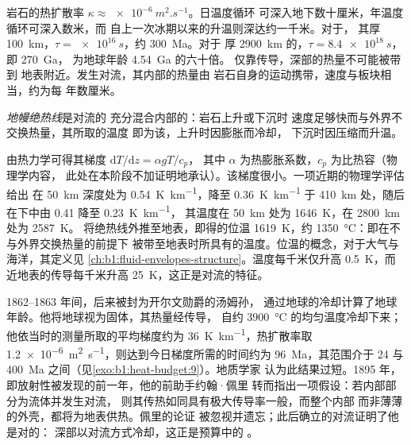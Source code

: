 岩石的热扩散率 $\kappa \approx \qty{e-6}{m^2.s^{-1}}$。日温度循环
可深入地下数十厘米，年温度循环可深入数米，而
自上一次冰期以来的升温则深达约一千米。对于，
其厚 \qty{100}{km}，$\tau = \qty{e16}{s}$，约 \qty{300}{Ma}。对于
厚 \qty{2900}{km} 的，$\tau = \qty{8.4e18}{s}$，即 \qty{270}{Ga}，
为地球年龄 \qty{4.54}{Ga} 的六十倍。%
仅靠传导，深部的热量不可能被带到
地表附近。发生对流，其内部的热量由
岩石自身的运动携带，速度与板块相当，约为每
年数厘米。%

\begin{definition}[地幔绝热线]\label{def:b1:heat-budget:adiabat}
\emph{地幔绝热线}是对流的
充分混合内部的：岩石上升或下沉时
速度足够快而与外界不交换热量，其所取的温度
即为该，上升时因膨胀而冷却，
下沉时因压缩而升温。
\end{definition}

由热力学可得其梯度 $\mathrm dT/\mathrm dz = \alpha g T/c_p$，
其中 $\alpha$ 为热膨胀系数，$c_p$ 为比热容（物理学内容，
此处在本阶段不加证明地承认）。该梯度很小。一项近期的物理学评估给出
在 \qty{50}{km} 深度处为 \qty{0.54}{K.km^{-1}}，降至 \qty{0.36}{K.km^{-1}}
于 \qty{410}{km} 处，随后在下中由 0.41 降至 \qty{0.23}{K.km^{-1}}，
其温度在 \qty{50}{km} 处为 \qty{1646}{K}，在 \qty{2800}{km} 处为 \qty{2587}{K}。
将绝热线外推至地表，即得的位温
\qty{1619}{K}，约 \qty{1350}{\degreeCelsius}：即在不与外界交换热量的前提下
被带至地表时所具有的温度。位温的概念，对于大气与
海洋，其定义见
\cref{ch:b1:fluid-envelopes-structure}。温度每千米仅升高
\qty{0.5}{K}，而近地表的传导每千米升高
\qty{25}{K}，这正是对流的特征。

\begin{history}[约翰·佩里与冷却的地球]
1862--1863 年间，后来被封为开尔文勋爵的汤姆孙，
通过地球的冷却计算了地球年龄。他将地球视为固体，其热量经传导，
自约 \qty{3900}{\degreeCelsius} 的均匀温度冷却下来；
他依当时的测量所取的平均梯度约为
\qty{36}{K.km^{-1}}，热扩散率取
\qty{1.2e-6}{m^2.s^{-1}}，则达到今日梯度所需的时间约为
\qty{96}{Ma}，其范围介于 24 与 \qty{400}{Ma} 之间（见\cref{exo:b1:heat-budget:9}）。地质学家
认为此结果过短。1895 年，
即放射性被发现的前一年，他的前助手约翰·佩里
转而指出一项假设：若内部部分为流体并发生对流，
则其传热如同具有极大传导率一般，而整个内部
而非薄薄的外壳，都将为地表供热。佩里的论证
被忽视并遗忘；此后确立的对流证明了他是对的：
深部以对流方式冷却，这正是预算中的
。%
\end{history}

